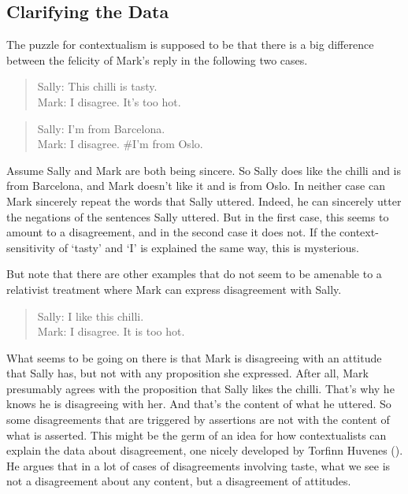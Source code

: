 \documentclass[
  10pt,
  letterpaper,
  DIV=11,
  numbers=noendperiod,
  twoside]{scrartcl}
\begin{document}
\subsection{Clarifying the Data}\label{clarifyingthedata}

The puzzle for contextualism is supposed to be that there is a big
difference between the felicity of Mark's reply in the following two
cases.

\begin{quote}
Sally: This chilli is tasty.\\
Mark: I disagree. It's too hot.
\end{quote}

\begin{quote}
Sally: I'm from Barcelona.\\
Mark: I disagree. \#I'm from Oslo.
\end{quote}

Assume Sally and Mark are both being sincere. So Sally does like the
chilli and is from Barcelona, and Mark doesn't like it and is from Oslo.
In neither case can Mark sincerely repeat the words that Sally uttered.
Indeed, he can sincerely utter the negations of the sentences Sally
uttered. But in the first case, this seems to amount to a disagreement,
and in the second case it does not. If the context-sensitivity of
`tasty' and `I' is explained the same way, this is mysterious.

But note that there are other examples that do not seem to be amenable
to a relativist treatment where Mark can express disagreement with
Sally.

\begin{quote}
Sally: I like this chilli.\\
Mark: I disagree. It is too hot.
\end{quote}

What seems to be going on there is that Mark is disagreeing with an
attitude that Sally has, but not with any proposition she expressed.
After all, Mark presumably agrees with the proposition that Sally likes
the chilli. That's why he knows he is disagreeing with her. And that's
the content of what he uttered. So some disagreements that are triggered
by assertions are not with the content of what is asserted. This might
be the germ of an idea for how contextualists can explain the data about
disagreement, one nicely developed by Torfinn Huvenes
(). He argues that in a lot of cases of
disagreements involving taste, what we see is not a disagreement about
any content, but a disagreement of attitudes.
\end{document}
